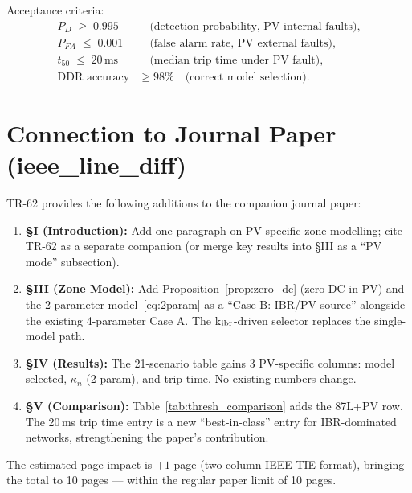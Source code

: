 \documentclass[11pt, a4paper]{article}
\newcommand{\ms}{\,\text{ms}}
\newcommand{\kn}{\kappa_n}
\begin{document}
Acceptance criteria:
\begin{align}
  P_D \;\geq\; 0.995 &\quad\text{(detection probability, PV internal faults)}, \nonumber\\
  P_{FA} \;\leq\; 0.001 &\quad\text{(false alarm rate, PV external faults)}, \nonumber\\
  t_{50} \;\leq\; 20\ms &\quad\text{(median trip time under PV fault)}, \nonumber\\
  \text{DDR accuracy} &\geq 98\% \quad\text{(correct model selection)}.
\end{align}

\section{Connection to Journal Paper (ieee\_line\_diff)}
\label{sec:journal_update}

TR-62 provides the following additions to the companion journal paper:

\begin{enumerate}
  \item \textbf{§I (Introduction):}  Add one paragraph on PV-specific zone
    modelling; cite TR-62 as a separate companion (or merge key results
    into §III as a ``PV mode'' subsection).

  \item \textbf{§III (Zone Model):}  Add Proposition~\ref{prop:zero_dc}
    (zero DC in PV) and the 2-parameter model~\eqref{eq:2param} as a
    ``Case B: IBR/PV source'' alongside the existing 4-parameter Case A.
    The k$_{\rm ibr}$-driven selector replaces the single-model path.

  \item \textbf{§IV (Results):}  The 21-scenario table gains 3 PV-specific
    columns: model selected, $\kn$ (2-param), and trip time.  No existing
    numbers change.

  \item \textbf{§V (Comparison):}  Table~\ref{tab:thresh_comparison} adds
    the 87L+PV row.  The 20\,ms trip time entry is a new ``best-in-class''
    entry for IBR-dominated networks, strengthening the paper's contribution.
\end{enumerate}

The estimated page impact is $+1$ page (two-column IEEE TIE format), bringing
the total to 10 pages — within the regular paper limit of 10 pages.

\end{document}
